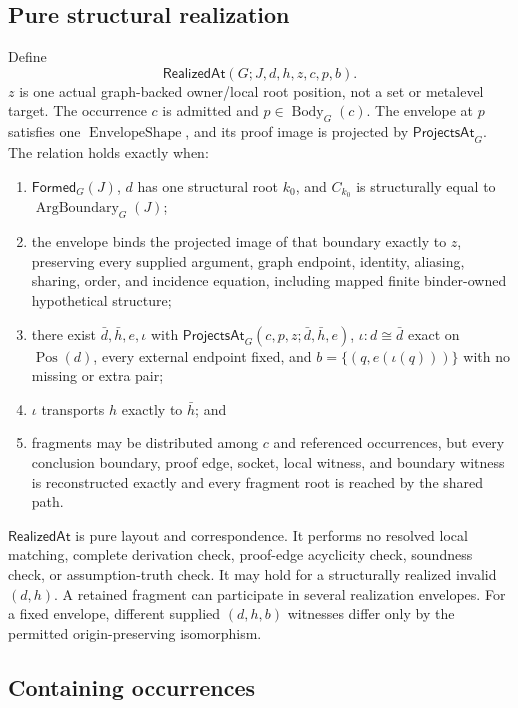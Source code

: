 \documentclass[11pt,twoside]{article}
\newcommand{\Formed}{\mathsf{Formed}}
\newcommand{\RealizedAt}{\mathsf{RealizedAt}}
\newcommand{\ProjectsAt}{\mathsf{ProjectsAt}}
\begin{document}
\subsection{Pure structural realization}

Define
\[
  \RealizedAt(G;J,d,h,z,c,p,b).
\]
\(z\) is one actual graph-backed owner/local root position, not a set or metalevel
target.  The occurrence \(c\) is admitted and
\(p\in\operatorname{Body}_G(c)\).  The envelope at
\(p\) satisfies one \(\operatorname{EnvelopeShape}\), and its proof image is
projected by \(\ProjectsAt_G\).  The relation holds exactly when:

\begin{enumerate}[leftmargin=2.2em]
  \item \(\Formed_G(J)\), \(d\) has one structural root \(k_0\), and
        \(C_{k_0}\) is structurally equal to
        \(\operatorname{ArgBoundary}_G(J)\);
  \item the envelope binds the projected image of that boundary exactly to \(z\),
        preserving every supplied argument, graph endpoint, identity, aliasing,
        sharing, order, and incidence equation, including mapped finite
        binder-owned hypothetical structure;
  \item there exist \(\bar d,\bar h,e,\iota\) with
        \(\ProjectsAt_G(c,p,z;\bar d,\bar h,e)\),
        \(\iota:d\cong\bar d\) exact on \(\operatorname{Pos}(d)\), every external
        endpoint fixed, and \(b=\{(q,e(\iota(q)))\}\) with no missing or extra pair;
  \item \(\iota\) transports \(h\) exactly to \(\bar h\); and
  \item fragments may be distributed among \(c\) and referenced occurrences, but
        every conclusion boundary, proof edge, socket, local witness, and boundary
        witness is reconstructed exactly and every fragment root is reached by the
        shared path.
\end{enumerate}

\(\RealizedAt\) is pure layout and correspondence.  It performs no resolved local
matching, complete derivation check, proof-edge acyclicity check, soundness check,
or assumption-truth check.  It may hold for a structurally realized invalid
\((d,h)\).  A retained fragment can participate in several realization envelopes.
For a fixed envelope, different supplied \((d,h,b)\) witnesses differ only by the
permitted origin-preserving isomorphism.

\subsection{Containing occurrences}
\end{document}

